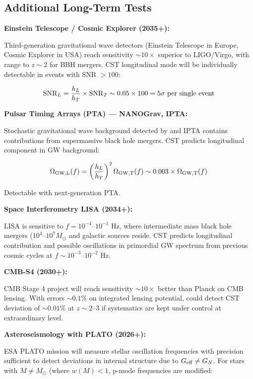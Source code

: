 \documentclass[11pt,a4paper]{article}
\begin{document}
\hypertarget{additional-long-term-tests}{%
\subsection{Additional Long-Term
Tests}\label{additional-long-term-tests}}

\textbf{Einstein Telescope / Cosmic Explorer (2035+):}

Third-generation gravitational wave detectors (Einstein Telescope in
Europe, Cosmic Explorer in USA) reach sensitivity \(\sim 10\times\)
superior to LIGO/Virgo, with range to \(z \sim 2\) for BBH mergers. CST
longitudinal mode will be individually detectable in events with SNR
\(> 100\):

\[{\rm SNR}_L = \frac{h_L}{h_T} \times {\rm SNR}_{T} \sim 0.05 \times 100 = 5\sigma~\text{per single event}\]

\textbf{Pulsar Timing Arrays (PTA) --- NANOGrav, IPTA:}

Stochastic gravitational wave background detected by \cite{NANOGravCollaboration2023} and
IPTA contains contributions from supermassive black hole mergers. CST
predicts longitudinal component in GW background:

\[\Omega_{\rm GW,L}(f) = \left(\frac{h_L}{h_T}\right)^2 \Omega_{\rm GW,T}(f) \sim 0.003 \times \Omega_{\rm GW,T}(f)\]

Detectable with next-generation PTA.

\textbf{Space Interferometry LISA (2034+):}

LISA is sensitive to \(f = 10^{-4}\)--\(10^{-1}\) Hz, where intermediate
mass black hole mergers (\(10^4\)--\(10^7 M_\odot\) and galactic
sources reside. CST predicts longitudinal contribution and possible
oscillations in primordial GW spectrum from previous cosmic cycles at
\(f \sim 10^{-3}\)--\(10^{-2}\) Hz.

\textbf{CMB-S4 (2030+):}

CMB Stage 4 project will reach sensitivity \(\sim 10\times\) better than
Planck on CMB lensing. With errors \(\sim 0.1\%\) on integrated lensing
potential, could detect CST deviation of \(\sim 0.01\%\) at
\(z \sim 2\)--3 if systematics are kept under control at extraordinary
level.

\textbf{Asteroseismology with PLATO (2026+):}

ESA PLATO mission will measure stellar oscillation frequencies with
precision sufficient to detect deviations in internal structure due to
\(G_{\rm eff} \neq G_N\). For stars with \(M \neq M_\odot\) (where
\(w(M) < 1\), p-mode frequencies are modified:
\end{document}
